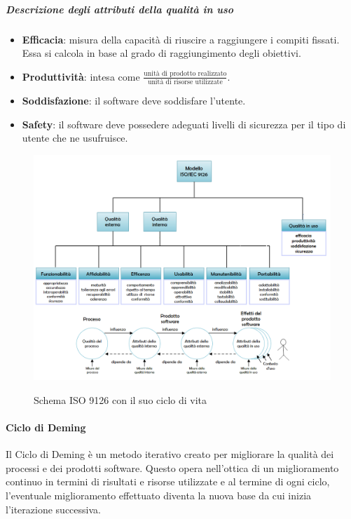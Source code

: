 		\subparagraph{Descrizione degli attributi della qualità in uso}
		\begin{itemize}
			\item \textbf{Efficacia}: misura della capacità di riuscire a raggiungere i compiti fissati. Essa si calcola in base al grado di raggiungimento degli obiettivi.
			\item \textbf{Produttività}: intesa come $ \frac{\text{unità di prodotto realizzato}}{\text{unità di risorse utilizzate}} $.
			\item \textbf{Soddisfazione}: il software deve soddisfare l'utente.
			\item \textbf{Safety}: il software deve possedere adeguati livelli di sicurezza per il tipo di utente che ne usufruisce.
		\end{itemize}

	\begin{figure}[H]
		\includegraphics[width=\textwidth]{img/ISO9126_full.png}
		\label{fig:iso9126}
		\caption[Schema ISO 9126 con il suo ciclo di vita]{Schema ISO 9126 con il suo ciclo di vita\protect\footnotemark}
	\end{figure}


	\paragraph{Ciclo di Deming}\label{cicloDeming}
	Il Ciclo di Deming è un metodo iterativo creato per migliorare la qualità dei processi e dei prodotti software.
	Questo opera nell'ottica di un miglioramento continuo in termini di risultati e risorse utilizzate e al termine di ogni ciclo,
	l'eventuale miglioramento effettuato diventa la nuova base da cui inizia l'iterazione successiva.

